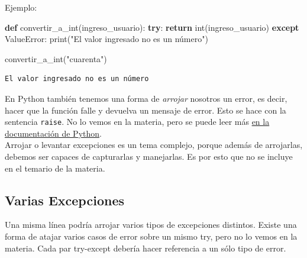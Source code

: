 \documentclass[
  letterpaper,
  DIV=11,
  numbers=noendperiod]{scrreprt}
\newenvironment{Shaded}{\begin{snugshade}}{\end{snugshade}}
\newcommand{\BuiltInTok}[1]{\textcolor[rgb]{0.00,0.23,0.31}{#1}}
\newcommand{\ControlFlowTok}[1]{\textcolor[rgb]{0.00,0.23,0.31}{\textbf{#1}}}
\newcommand{\KeywordTok}[1]{\textcolor[rgb]{0.00,0.23,0.31}{\textbf{#1}}}
\newcommand{\NormalTok}[1]{\textcolor[rgb]{0.00,0.23,0.31}{#1}}
\newcommand{\PreprocessorTok}[1]{\textcolor[rgb]{0.68,0.00,0.00}{#1}}
\newcommand{\StringTok}[1]{\textcolor[rgb]{0.13,0.47,0.30}{#1}}
\begin{document}
Ejemplo:

\begin{Shaded}
\begin{Highlighting}[]
\KeywordTok{def}\NormalTok{ convertir\_a\_int(ingreso\_usuario):}
  \ControlFlowTok{try}\NormalTok{:}
    \ControlFlowTok{return} \BuiltInTok{int}\NormalTok{(ingreso\_usuario)}
  \ControlFlowTok{except} \PreprocessorTok{ValueError}\NormalTok{:}
    \BuiltInTok{print}\NormalTok{(}\StringTok{"El valor ingresado no es un número"}\NormalTok{)}

\NormalTok{convertir\_a\_int(}\StringTok{"cuarenta"}\NormalTok{)}
\end{Highlighting}
\end{Shaded}

\begin{verbatim}
El valor ingresado no es un número
\end{verbatim}

\begin{tcolorbox}[enhanced jigsaw, opacitybacktitle=0.6, toptitle=1mm, toprule=.15mm, arc=.35mm, breakable, bottomrule=.15mm, opacityback=0, leftrule=.75mm, rightrule=.15mm, title=\textcolor{quarto-callout-note-color}{\faInfo}\hspace{0.5em}{Note}, left=2mm, bottomtitle=1mm, colframe=quarto-callout-note-color-frame, colback=white, titlerule=0mm, coltitle=black, colbacktitle=quarto-callout-note-color!10!white]

En Python también tenemos una forma de \emph{arrojar} nosotros un error,
es decir, hacer que la función falle y devuelva un mensaje de error.
Esto se hace con la sentencia \texttt{raise}. No lo vemos en la materia,
pero se puede leer más
\href{https://docs.python.org/es/3/c-api/exceptions.html\#raising-exceptions}{en
la documentación de Python}.\\
Arrojar o levantar excepciones es un tema complejo, porque además de
arrojarlas, debemos ser capaces de capturarlas y manejarlas. Es por esto
que no se incluye en el temario de la materia.

\end{tcolorbox}

\subsection{Varias Excepciones}\label{varias-excepciones}

Una misma línea podría arrojar varios tipos de excepciones distintos.
Existe una forma de atajar varios casos de error sobre un mismo try,
pero no lo vemos en la materia. Cada par try-except debería hacer
referencia a un sólo tipo de error.
\end{document}
